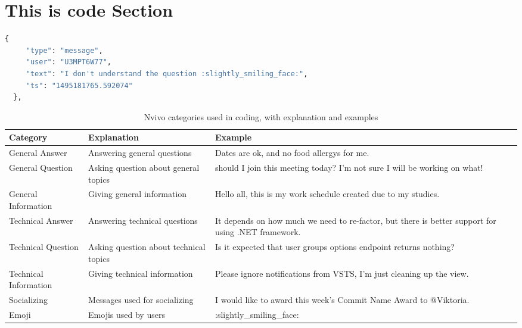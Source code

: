 \section{This is code Section}

\begin{lstlisting}[language=Python, caption=JSON example]
 {
     "type": "message",
     "user": "U3MPT6W77",
     "text": "I don't understand the question :slightly_smiling_face:",
     "ts": "1495181765.592074"
  },
\end{lstlisting}












\begin{table}
\caption{Nvivo categories used in coding, with explanation and examples}
\label{tab:nvivo}
\bigskip
\centering\small\setlength\tabcolsep{2pt}
\hspace*{-1cm}\begin{tabular}{lll}
\toprule
\textbf{Category} & \textbf{Explanation} & \textbf{Example}\\
\midrule
General Answer & Answering general questions & Dates are ok, and no food allergys for me.\\
General Question & Asking question about general topics &  should I join this meeting today? I'm not sure I will be working on what!\\
General Information & Giving general information & Hello all, this is my work schedule created due to my studies.\\
Technical Answer & Answering technical questions & It depends on how much we need to re-factor, but there is better support for using .NET framework.\\ 
Technical Question & Asking question about technical topics & Is it expected that user groups options endpoint returns nothing?\\ 
Technical Information & Giving technical information & Please ignore notifications from VSTS, I'm just cleaning up the view.\\ 
Socializing & Messages used for socializing & I would like to award this week’s Commit Name Award to @Viktoria.\\
Emoji & Emojis used by users & :slightly\_smiling\_face: \\
\bottomrule
\end{tabular}\hspace*{-1cm}
\end{table}
